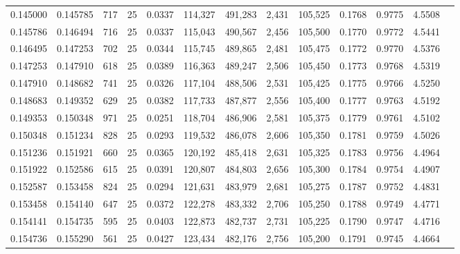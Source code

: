 \begin{tabular}{rrrrrrrrrrrrr}
0.145000 & 0.145785 &   717 &  25 &                                     0.0337 & 114,327 & 491,283 &   2,431 & 105,525 & 0.1768 & 0.9775 & 4.5508 \\
0.145786 & 0.146494 &   716 &  25 &                                     0.0337 & 115,043 & 490,567 &   2,456 & 105,500 & 0.1770 & 0.9772 & 4.5441 \\
0.146495 & 0.147253 &   702 &  25 &                                     0.0344 & 115,745 & 489,865 &   2,481 & 105,475 & 0.1772 & 0.9770 & 4.5376 \\
0.147253 & 0.147910 &   618 &  25 &                                     0.0389 & 116,363 & 489,247 &   2,506 & 105,450 & 0.1773 & 0.9768 & 4.5319 \\
0.147910 & 0.148682 &   741 &  25 &                                     0.0326 & 117,104 & 488,506 &   2,531 & 105,425 & 0.1775 & 0.9766 & 4.5250 \\
0.148683 & 0.149352 &   629 &  25 &                                     0.0382 & 117,733 & 487,877 &   2,556 & 105,400 & 0.1777 & 0.9763 & 4.5192 \\
0.149353 & 0.150348 &   971 &  25 &                                     0.0251 & 118,704 & 486,906 &   2,581 & 105,375 & 0.1779 & 0.9761 & 4.5102 \\
0.150348 & 0.151234 &   828 &  25 &                                     0.0293 & 119,532 & 486,078 &   2,606 & 105,350 & 0.1781 & 0.9759 & 4.5026 \\
0.151236 & 0.151921 &   660 &  25 &                                     0.0365 & 120,192 & 485,418 &   2,631 & 105,325 & 0.1783 & 0.9756 & 4.4964 \\
0.151922 & 0.152586 &   615 &  25 &                                     0.0391 & 120,807 & 484,803 &   2,656 & 105,300 & 0.1784 & 0.9754 & 4.4907 \\
0.152587 & 0.153458 &   824 &  25 &                                     0.0294 & 121,631 & 483,979 &   2,681 & 105,275 & 0.1787 & 0.9752 & 4.4831 \\
0.153458 & 0.154140 &   647 &  25 &                                     0.0372 & 122,278 & 483,332 &   2,706 & 105,250 & 0.1788 & 0.9749 & 4.4771 \\
0.154141 & 0.154735 &   595 &  25 &                                     0.0403 & 122,873 & 482,737 &   2,731 & 105,225 & 0.1790 & 0.9747 & 4.4716 \\
0.154736 & 0.155290 &   561 &  25 &                                     0.0427 & 123,434 & 482,176 &   2,756 & 105,200 & 0.1791 & 0.9745 & 4.4664 \\

\end{tabular}
